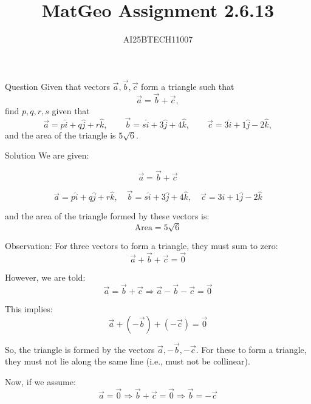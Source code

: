 \documentclass{beamer}
\title 
{MatGeo Assignment 2.6.13}
\author
{AI25BTECH11007}
\begin{document}
\frame{\titlepage}
\begin{frame}{Question}
Given that vectors $\vec{a},\vec{b},\vec{c}$ form a triangle such that
\[
\vec{a}=\vec{b}+\vec{c},
\]
find $p,q,r,s$ given that
\[
\vec{a}=p\hat{i}+q\hat{j}+r\hat{k},\qquad
\vec{b}=s\hat{i}+3\hat{j}+4\hat{k},\qquad
\vec{c}=3\hat{i}+1\hat{j}-2\hat{k},
\]
and the area of the triangle is $5\sqrt{6}$.\\


\end{frame}
\begin{frame}{Solution}
We are given:

\begin{equation}
\vec{a} = \vec{b} + \vec{c}
\end{equation}

\begin{equation}
\vec{a} = p\hat{i} + q\hat{j} + r\hat{k}, \quad
\vec{b} = s\hat{i} + 3\hat{j} + 4\hat{k}, \quad
\vec{c} = 3\hat{i} + 1\hat{j} -2\hat{k}
\end{equation}

and the area of the triangle formed by these vectors is:
\begin{equation}
\text{Area} = 5\sqrt{6}
\end{equation}

\vspace{1em}
\end{frame}
\begin{frame}{Observation:}
For three vectors to form a triangle, they must sum to zero:
\begin{equation}
\vec{a} + \vec{b} + \vec{c} = \vec{0}
\end{equation}

However, we are told:
\begin{equation}
\vec{a} = \vec{b} + \vec{c} \Rightarrow \vec{a} - \vec{b} - \vec{c} = \vec{0}
\end{equation}

This implies:
\begin{equation}
\vec{a} + (-\vec{b}) + (-\vec{c}) = \vec{0}
\end{equation}

So, the triangle is formed by the vectors $\vec{a}, -\vec{b}, -\vec{c}$. For these to form a triangle, they must not lie along the same line (i.e., must not be collinear).

\vspace{1em}
Now, if we assume:
\begin{equation}
\vec{a} = \vec{0}
\Rightarrow \vec{b} + \vec{c} = \vec{0}
\Rightarrow \vec{b} = -\vec{c}
\end{equation}
\end{frame}
\end{document}
